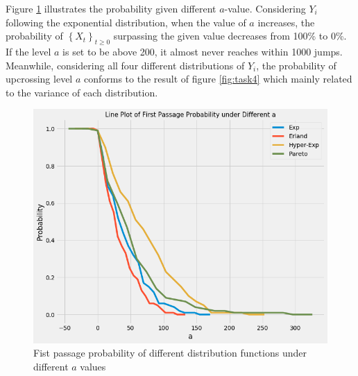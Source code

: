 Figure \ref{fig:task5-4} illustrates the probability given different $a$-value. Considering $Y_i$ following the  exponential distribution, when the value of $a$ increases, the probability of $\left\{X_{t}\right\}_{t \geq 0}$ surpassing the given value decreases from 100\% to 0\%. If the level $a$ is set to be above 200, it almost never reaches within 1000 jumps. Meanwhile, considering all four different distributions of $Y_i$, the probability of upcrossing level $a$ conforms to the result of figure \ref{fig:task4} which mainly related to the variance of each distribution.

\begin{figure}[H]
    \centering
    \includegraphics[scale = 0.45]{figures/task5-4.png}
    \caption{Fist passage probability of different distribution functions under different $a$ values}
    \label{fig:task5-4}
\end{figure}


\newpage




